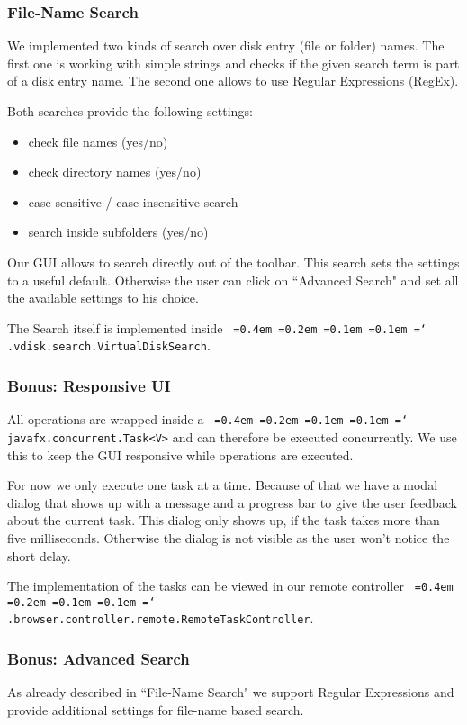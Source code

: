 \documentclass[a4paper,12pt]{article}
\newcommand*\justify{%
  \fontdimen2\font=0.4em%
  \fontdimen3\font=0.2em%
  \fontdimen4\font=0.1em%
  \fontdimen7\font=0.1em%
  \hyphenchar\font=`\-%
}
\newcommand{\mono}[1]{\texttt{\justify #1}}
\begin{document}
\subsubsection{File-Name Search}
We implemented two kinds of search over disk entry (file or folder) names. The first one is working with simple strings and checks if the given search term is part of a disk entry name. The second one allows to use Regular Expressions (RegEx).

Both searches provide the following settings:
\begin{itemize}
    \item check file names (yes/no)
    \item check directory names (yes/no)
    \item case sensitive / case insensitive search
    \item search inside subfolders (yes/no)
\end{itemize}

Our GUI allows to search directly out of the toolbar. This search sets the settings to a useful default. Otherwise the user can click on ``Advanced Search" and set all the available settings to his choice.

The Search itself is implemented inside \mono{.vdisk.search.VirtualDiskSearch}.

\subsubsection{Bonus: Responsive UI}
All operations are wrapped inside a \mono{javafx.concurrent.Task<V>} and can therefore be executed concurrently. We use this to keep the GUI responsive while operations are executed.

For now we only execute one task at a time. Because of that we have a modal dialog that shows up with a message and a progress bar to give the user feedback about the current task. This dialog only shows up, if the task takes more than five milliseconds. Otherwise the dialog is not visible as the user won't notice the short delay.

The implementation of the tasks can be viewed in our remote controller \mono{.browser.controller.remote.RemoteTaskController}.

\subsubsection{Bonus: Advanced Search}
As already described in ``File-Name Search" we support Regular Expressions and provide additional settings for file-name based search.
\end{document}
